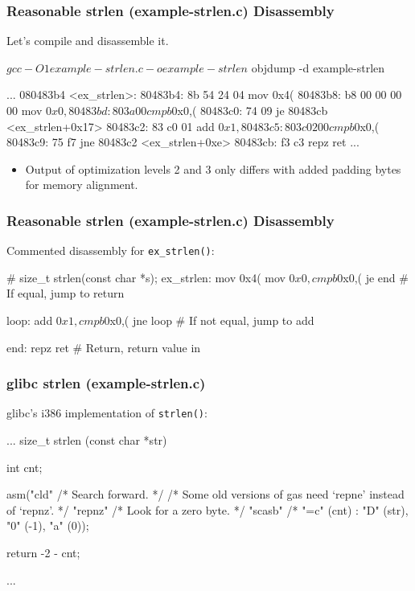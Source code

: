\documentclass[11pt,xcolor=dvipsnames]{beamer}
\newcommand{\vs}{\vspace{0.5em}}
\begin{document}
\begin{frame}[fragile,t]
\frametitle{Reasonable strlen (example-strlen.c) Disassembly}
Let's compile and disassemble it.\vs
\begin{customobjdumpcode}
$ gcc -O1 example-strlen.c -o example-strlen
$ objdump -d example-strlen

...
080483b4 <ex_strlen>:
 80483b4: 8b 54 24 04     mov    0x4(%
 80483b8: b8 00 00 00 00  mov    $0x0,%
 80483bd: 80 3a 00        cmpb   $0x0,(%
 80483c0: 74 09           je     80483cb <ex_strlen+0x17>
 80483c2: 83 c0 01        add    $0x1,%
 80483c5: 80 3c 02 00     cmpb   $0x0,(%
 80483c9: 75 f7           jne    80483c2 <ex_strlen+0xe>
 80483cb: f3 c3           repz ret
...
\end{customobjdumpcode}
\begin{itemize}
	\item Output of optimization levels 2 and 3 only differs with added padding bytes for memory alignment.
\end{itemize}
\end{frame}

\begin{frame}[fragile,t]
\frametitle{Reasonable strlen (example-strlen.c) Disassembly}
Commented disassembly for \verb+ex_strlen()+:\vs
\begin{gascode}
# size_t strlen(const char *s);
ex_strlen:
  mov    0x4(%
  mov    $0x0,%
  cmpb   $0x0,(%
  je     end                  #    If equal, jump to return

  loop:
    add    $0x1,%
    cmpb   $0x0,(%
    jne    loop               #    If not equal, jump to add

  end:
  repz ret                  # Return, return value in %
\end{gascode}
\end{frame}

\begin{frame}[fragile,t]
\frametitle{glibc strlen (example-strlen.c)}
glibc's i386 implementation of \verb+strlen()+:\vs
{}
\begin{ccode}
...
size_t
strlen (const char *str)
{
  int cnt;

  asm("cld\n"                   /* Search forward.  */
      /* Some old versions of gas need `repne' instead of `repnz'.  */
      "repnz\n"                 /* Look for a zero byte.  */
      "scasb" /* %
      "=c" (cnt) : "D" (str), "0" (-1), "a" (0));

  return -2 - cnt;
}
...
\end{ccode}
\end{frame}
\end{document}
